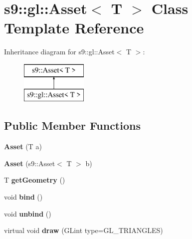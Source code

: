 \hypertarget{classs9_1_1gl_1_1Asset}{\section{s9\-:\-:gl\-:\-:Asset$<$ T $>$ Class Template Reference}
\label{classs9_1_1gl_1_1Asset}
}
Inheritance diagram for s9\-:\-:gl\-:\-:Asset$<$ T $>$\-:\begin{figure}[H]
\begin{center}
\leavevmode
\includegraphics[height=2.000000cm]{classs9_1_1gl_1_1Asset}
\end{center}
\end{figure}
\subsection*{Public Member Functions}
\begin{DoxyCompactItemize}
\item 
\hypertarget{classs9_1_1gl_1_1Asset_afdaf55d0932c489fb66dd37f23e4e1ea}{{\bfseries Asset} (T a)}\label{classs9_1_1gl_1_1Asset_afdaf55d0932c489fb66dd37f23e4e1ea}

\item 
\hypertarget{classs9_1_1gl_1_1Asset_a1fae98d00dcab688cffb2af3953b7a90}{{\bfseries Asset} (s9\-::\-Asset$<$ T $>$ b)}\label{classs9_1_1gl_1_1Asset_a1fae98d00dcab688cffb2af3953b7a90}

\item 
\hypertarget{classs9_1_1gl_1_1Asset_acd9db6e18f15e14e660061cacffa5f1a}{T {\bfseries get\-Geometry} ()}\label{classs9_1_1gl_1_1Asset_acd9db6e18f15e14e660061cacffa5f1a}

\item 
\hypertarget{classs9_1_1gl_1_1Asset_a249ce98e359d6edfd1ebacde2a0b9f11}{void {\bfseries bind} ()}\label{classs9_1_1gl_1_1Asset_a249ce98e359d6edfd1ebacde2a0b9f11}

\item 
\hypertarget{classs9_1_1gl_1_1Asset_a8efec5de94c4873764c37799a3247532}{void {\bfseries unbind} ()}\label{classs9_1_1gl_1_1Asset_a8efec5de94c4873764c37799a3247532}

\item 
\hypertarget{classs9_1_1gl_1_1Asset_ac6cefb6744aafd2454260ce40309ea34}{virtual void {\bfseries draw} (G\-Lint type=G\-L\-\_\-\-T\-R\-I\-A\-N\-G\-L\-E\-S)}\label{classs9_1_1gl_1_1Asset_ac6cefb6744aafd2454260ce40309ea34}

\end{DoxyCompactItemize}
